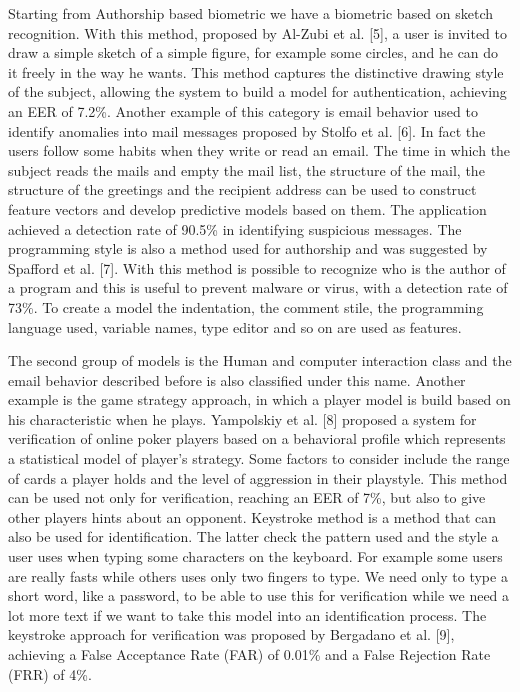 \documentclass[12pt]{report}
\begin{document}
Starting from Authorship based biometric we have a biometric based on sketch recognition. 
With this method, proposed by Al-Zubi et al. [5], a user is invited to draw a simple sketch of a simple figure, for example some circles, and he can do it freely in the way he wants.
This method captures the distinctive drawing style of the subject, allowing the system to build a model for authentication, achieving an EER of 7.2\%.
Another example of this category is email behavior used to identify anomalies into mail messages proposed by Stolfo et al. [6].
In fact the users follow some habits when they write or read an email.
The time in which the subject reads the mails and empty the mail list, the structure of the mail, the structure of the greetings and the recipient address can be used to construct feature vectors and develop predictive models based on them.
The application achieved a detection rate of 90.5\% in identifying suspicious messages.
The programming style is also a method used for authorship and was suggested by Spafford et al. [7]. 
With this method is possible to recognize who is the author of a program and this is useful to prevent malware or virus, with a detection rate of 73\%.
To create a model the indentation, the comment stile, the programming language used, variable names, type editor and so on are used as features.

The second group of models is the Human and computer interaction class and the email behavior described before is also classified under this name.
Another example is the game strategy approach, in which a player model is build based on his characteristic when he plays.
Yampolskiy et al. [8] proposed a system for verification of online poker players based on a behavioral profile which represents a statistical model of player's strategy.
Some factors to consider include the range of cards a player holds and the level of aggression in their playstyle. 
This method can be used not only for verification, reaching an EER of 7\%, but also to give other players hints about an opponent.
Keystroke method is a method that can also be used for identification. 
The latter check the pattern used and the style a user uses when typing some characters on the keyboard. 
For example some users are really fasts while others uses only two fingers to type.
We need only to type a short word, like a password, to be able to use this for verification while we need a lot more text if we want to take this model into an identification process.
The keystroke approach for verification was proposed by Bergadano et al. [9], achieving a False Acceptance Rate (FAR) of 0.01\% and a False Rejection Rate (FRR) of 4\%.
\end{document}
